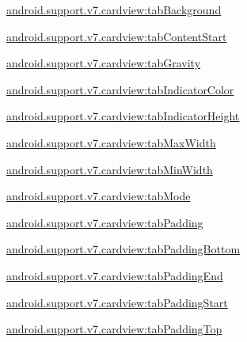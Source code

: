 {\ttfamily \hyperlink{classandroid_1_1support_1_1v7_1_1cardview_1_1R_1_1styleable_a92606b2725987ce07684e8a6f7e3e136}{android.\+support.\+v7.\+cardview\+:tab\+Background}}

{\ttfamily \hyperlink{classandroid_1_1support_1_1v7_1_1cardview_1_1R_1_1styleable_ad3da5de5c86701f6df05c289f3be2530}{android.\+support.\+v7.\+cardview\+:tab\+Content\+Start}}

{\ttfamily \hyperlink{classandroid_1_1support_1_1v7_1_1cardview_1_1R_1_1styleable_a1a68091dcc77c9282baf3784559785fe}{android.\+support.\+v7.\+cardview\+:tab\+Gravity}}

{\ttfamily \hyperlink{classandroid_1_1support_1_1v7_1_1cardview_1_1R_1_1styleable_a5a446283d0134089aec8213efafa7b65}{android.\+support.\+v7.\+cardview\+:tab\+Indicator\+Color}}

{\ttfamily \hyperlink{classandroid_1_1support_1_1v7_1_1cardview_1_1R_1_1styleable_a1105a0d35da90cf70f0f89791a05d979}{android.\+support.\+v7.\+cardview\+:tab\+Indicator\+Height}}

{\ttfamily \hyperlink{classandroid_1_1support_1_1v7_1_1cardview_1_1R_1_1styleable_aad4a6769c12845096dbfe0535274c45c}{android.\+support.\+v7.\+cardview\+:tab\+Max\+Width}}

{\ttfamily \hyperlink{classandroid_1_1support_1_1v7_1_1cardview_1_1R_1_1styleable_a02d9b59abfd1ddbbe8c4d2e6062f03a5}{android.\+support.\+v7.\+cardview\+:tab\+Min\+Width}}

{\ttfamily \hyperlink{classandroid_1_1support_1_1v7_1_1cardview_1_1R_1_1styleable_aa12cc853d9a48dbe68c02155169f3221}{android.\+support.\+v7.\+cardview\+:tab\+Mode}}

{\ttfamily \hyperlink{classandroid_1_1support_1_1v7_1_1cardview_1_1R_1_1styleable_adb8179e42e0e5cad97cc015e8c4569c0}{android.\+support.\+v7.\+cardview\+:tab\+Padding}}

{\ttfamily \hyperlink{classandroid_1_1support_1_1v7_1_1cardview_1_1R_1_1styleable_ae40b7013d65d0b7702c09dc73558e5d1}{android.\+support.\+v7.\+cardview\+:tab\+Padding\+Bottom}}

{\ttfamily \hyperlink{classandroid_1_1support_1_1v7_1_1cardview_1_1R_1_1styleable_a1ad3770f59bb7fecbbaafe593ca05da6}{android.\+support.\+v7.\+cardview\+:tab\+Padding\+End}}

{\ttfamily \hyperlink{classandroid_1_1support_1_1v7_1_1cardview_1_1R_1_1styleable_ad6c26e7168880fb2f4068b1ae3d08955}{android.\+support.\+v7.\+cardview\+:tab\+Padding\+Start}}

{\ttfamily \hyperlink{classandroid_1_1support_1_1v7_1_1cardview_1_1R_1_1styleable_a0d0eb9efbce84535b45c5779754d6dd3}{android.\+support.\+v7.\+cardview\+:tab\+Padding\+Top}}

